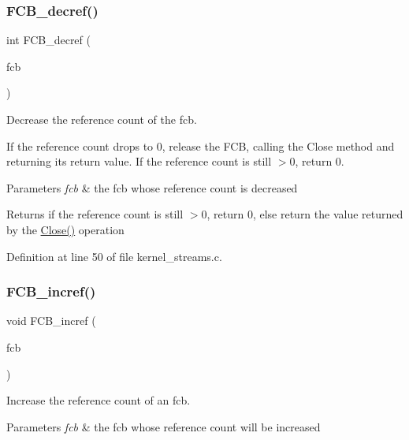 \subsubsection{\texorpdfstring{F\+C\+B\+\_\+decref()}{FCB\_decref()}}
{\footnotesize\ttfamily int F\+C\+B\+\_\+decref (\begin{DoxyParamCaption}\item[{\hyperlink{group__streams_ga0c7e751afb9d6cadebf070961804d400}{F\+CB} $\ast$}]{fcb }\end{DoxyParamCaption})}



Decrease the reference count of the fcb. 

If the reference count drops to 0, release the F\+CB, calling the Close method and returning its return value. If the reference count is still $>$0, return 0.


\begin{DoxyParams}{Parameters}
{\em fcb} & the fcb whose reference count is decreased \\
\hline
\end{DoxyParams}
\begin{DoxyReturn}{Returns}
if the reference count is still $>$0, return 0, else return the value returned by the {\ttfamily \hyperlink{group__syscalls_ga82187e2e98af053a2ab6cb516e9e7f5a}{Close()}} operation 
\end{DoxyReturn}


Definition at line 50 of file kernel\+\_\+streams.\+c.

\mbox{\label{group__streams_ga409efca0b415dfdabe868c292d1daf66}} 
\subsubsection{\texorpdfstring{F\+C\+B\+\_\+incref()}{FCB\_incref()}}
{\footnotesize\ttfamily void F\+C\+B\+\_\+incref (\begin{DoxyParamCaption}\item[{\hyperlink{group__streams_ga0c7e751afb9d6cadebf070961804d400}{F\+CB} $\ast$}]{fcb }\end{DoxyParamCaption})}



Increase the reference count of an fcb. 


\begin{DoxyParams}{Parameters}
{\em fcb} & the fcb whose reference count will be increased \\
\hline
\end{DoxyParams}


